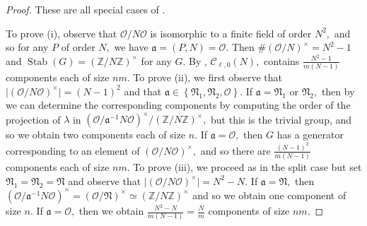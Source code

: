 \documentclass[11pt,a4paper]{amsart}
\theoremstyle{plain}
\theoremstyle{definition}
\theoremstyle{remark}
\DeclareMathOperator{\Stab}{Stab}
\begin{document}
\begin{proof}
  These are all special cases of .

  To prove (i), observe that $\mathcal{O}/N \mathcal{O}$ is isomorphic to a finite field of order $N^2,$ and so for any $P$ of order $N,$ we have $\mathfrak{a} = (P, N) = \mathcal{O}.$ Then $\#(\mathcal{O}/N)^{\times} = N^2-1$ and $\Stab(G) = (\mathbb{Z}/N \mathbb{Z})^{\times}$ for any $G.$ By , $\mathcal{C}_{\ell,0}(N),$ contains $\frac{N^2-1}{m(N-1)}$ components each of size $nm.$ To prove (ii), we first observe that $\lvert (\mathcal{O}/N \mathcal{O})^{\times} \rvert = (N-1)^2$ and that $\mathfrak{a} \in \left\{ \mathfrak{N}_1, \mathfrak{N}_2, \mathcal{O} \right\}.$ If $\mathfrak{a} = \mathfrak{N}_1$ or $\mathfrak{N}_2,$ then by  we can determine the corresponding components by computing the order of the projection of $\lambda$ in $(\mathcal{O}/\mathfrak{a}^{-1}N \mathcal{O})^{\times}/(\mathbb{Z}/N \mathbb{Z})^{\times},$ but this is the trivial group, and so we obtain two components each of size $n.$ If $\mathfrak{a} = \mathcal{O},$ then $G$ has a generator corresponding to an element of $(\mathcal{O}/N \mathcal{O})^{\times},$ and so there are $\frac{(N-1)^2}{m(N-1)}$ components each of size $nm.$ To prove (iii), we proceed as in the split case but set $\mathfrak{N}_{1} = \mathfrak{N}_{2} = \mathfrak{N}$ and observe that $\lvert (\mathcal{O} / N\mathcal{O})^{\times} \rvert = N^{2} - N.$ If $\mathfrak{a} = \mathfrak{N},$ then $(\mathcal{O}/\mathfrak{a}^{-1}N\mathcal{O})^{\times} = (\mathcal{O} / \mathfrak{N})^{\times} \simeq (\mathbb{Z} / N\mathbb{Z})^{\times}$ and so we obtain one component of size $n.$ If $\mathfrak{a} = \mathcal{O},$ then we obtain $\frac{N^{2}-N}{m(N-1)} = \frac{N}{m}$ components of size $nm.$
\end{proof}
\end{document}
